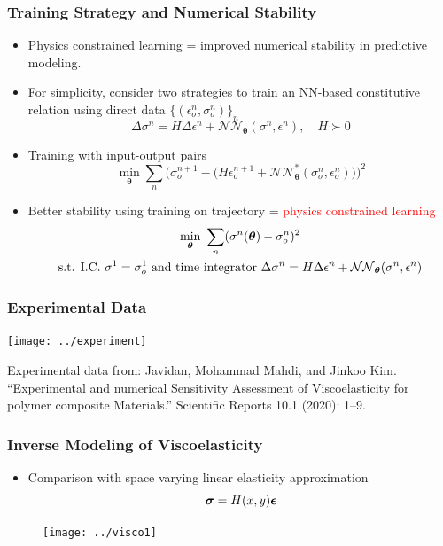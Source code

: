 \documentclass[usenames,dvipsnames]{beamer}
\newcommand{\bt}[0]{\bm{\theta}}
\begin{document}
\begin{frame}
	\frametitle{Training Strategy and Numerical Stability}
	
	\begin{itemize}
		\item Physics constrained learning = improved numerical stability in predictive modeling.
		\item For simplicity, consider two strategies to train an NN-based constitutive relation using direct data $\{(\epsilon_o^n, \sigma_o^n)\}_n$
		$$\Delta \sigma^n = H \Delta \epsilon^n + \mathcal{NN}_{\bt} (\sigma^n, \epsilon^n),\quad H \succ 0$$
		\item Training with input-output pairs
		$$\min_{\bt} \sum_n \Big(\sigma_o^{n+1} - \big(H\epsilon_o^{n+1} +  \mathcal{NN}_{\bt}^* (\sigma_o^n, \epsilon_o^n)\big) \Big)^2$$
		\item Better stability using training on trajectory = \textcolor{red}{physics constrained learning}
		\begin{gather*}
		\min_{\bt} \ \sum_n (\sigma^n(\bt) - \sigma_o^n)^2 \\
		\text{s.t. }\text{I.C.} \ \sigma^1 = \sigma^1_o \text{ and time integrator\ }
		{\small \Delta \sigma^n = H \Delta \epsilon^n + \mathcal{NN}_{\bt} (\sigma^n, \epsilon^n)}
		\end{gather*}
	\end{itemize}
\end{frame}

\begin{frame}
	\frametitle{Experimental Data}
	
	\texttt{[image: ../experiment]}
	
	{\scriptsize Experimental data from: Javidan, Mohammad Mahdi, and Jinkoo Kim. ``Experimental and numerical Sensitivity Assessment of Viscoelasticity for polymer composite Materials.'' Scientific Reports 10.1 (2020): 1--9.}
	
\end{frame}


\begin{frame}
	\frametitle{Inverse Modeling of Viscoelasticity}
	
	\begin{itemize}
		\item Comparison with space varying linear elasticity approximation
		\begin{equation*}
			\bm{\sigma} = H(x, y) \bm{\epsilon}
		\end{equation*}
	\end{itemize}
	\begin{figure}[hbt]
  \texttt{[image: ../visco1]}
\end{figure}

\end{frame}
\end{document}
